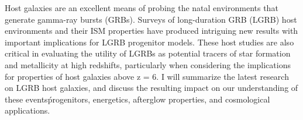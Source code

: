 


\bigskip



\bigskip

\noindent Host galaxies are an excellent means of probing the natal environments that generate gamma-ray bursts (GRBs). Surveys of long-duration GRB (LGRB) host environments and their ISM properties have produced intriguing new results with important implications for LGRB progenitor models. These host studies are also critical in evaluating the utility of LGRBs as potential tracers of star formation and metallicity at high redshifts, particularly when considering the implications for properties of host galaxies above z = 6. I will summarize the latest research on LGRB host galaxies, and discuss the resulting impact on our understanding of these events\' progenitors, energetics, afterglow properties, and cosmological applications.
